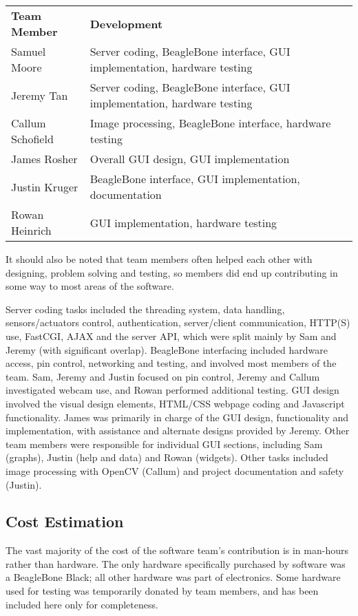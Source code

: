 \begin{tabular}{l|l}
	{\bf Team Member} & {\bf Development} \\
	Samuel Moore & Server coding, BeagleBone interface, GUI implementation, hardware testing \\
	Jeremy Tan & Server coding, BeagleBone interface, GUI implementation, hardware testing \\
	Callum Schofield & Image processing, BeagleBone interface, hardware testing \\
	James Rosher & Overall GUI design, GUI implementation \\
	Justin Kruger & BeagleBone interface,  GUI implementation, documentation \\
	Rowan Heinrich & GUI implementation, hardware testing
\end{tabular}

It should also be noted that team members often helped each other with designing, problem solving and testing, so members did end up contributing in some way to most areas of the software.


Server coding tasks included the threading system, data handling, sensors/actuators control, authentication, server/client communication, HTTP(S) use, FastCGI, AJAX and the server API, which were split mainly by Sam and Jeremy (with significant overlap). BeagleBone interfacing included hardware access, pin control, networking and testing, and involved most members of the team. Sam, Jeremy and Justin focused on pin control, Jeremy and Callum investigated webcam use, and Rowan performed additional testing. GUI design involved the visual design elements, HTML/CSS webpage coding and Javascript functionality. James was primarily in charge of the GUI design, functionality and implementation, with assistance and alternate designs provided by Jeremy. Other team members were responsible for individual GUI sections, including Sam (graphs), Justin (help and data) and Rowan (widgets). Other tasks included image processing with OpenCV (Callum) and project documentation and safety (Justin).

\subsection{Cost Estimation}

The vast majority of the cost of the software team's contribution is in man-hours rather than hardware. The only hardware specifically purchased by software was a BeagleBone Black; all other hardware was part of electronics. Some hardware used for testing was temporarily donated by team members, and has been included here only for completeness.


